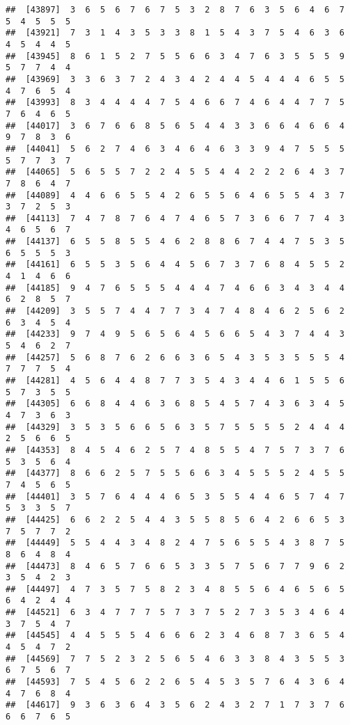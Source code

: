 \documentclass[
]{book}
\begin{document}
\begin{verbatim}
##  [43897]  3  6  5  6  7  6  7  5  3  2  8  7  6  3  5  6  4  6  7  5  4  5  5  5
##  [43921]  7  3  1  4  3  5  3  3  8  1  5  4  3  7  5  4  6  3  6  4  5  4  4  5
##  [43945]  8  6  1  5  2  7  5  5  6  6  3  4  7  6  3  5  5  5  9  5  7  7  4  4
##  [43969]  3  3  6  3  7  2  4  3  4  2  4  4  5  4  4  4  6  5  5  4  7  6  5  4
##  [43993]  8  3  4  4  4  4  7  5  4  6  6  7  4  6  4  4  7  7  5  7  6  4  6  5
##  [44017]  3  6  7  6  6  8  5  6  5  4  4  3  3  6  6  4  6  6  4  9  7  8  3  6
##  [44041]  5  6  2  7  4  6  3  4  6  4  6  3  3  9  4  7  5  5  5  5  7  7  3  7
##  [44065]  5  6  5  5  7  2  2  4  5  5  4  4  2  2  2  6  4  3  7  7  8  6  4  7
##  [44089]  4  4  6  6  5  5  4  2  6  5  5  6  4  6  5  5  4  3  7  3  7  2  5  3
##  [44113]  7  4  7  8  7  6  4  7  4  6  5  7  3  6  6  7  7  4  3  4  6  5  6  7
##  [44137]  6  5  5  8  5  5  4  6  2  8  8  6  7  4  4  7  5  3  5  6  5  5  5  3
##  [44161]  6  5  5  3  5  6  4  4  5  6  7  3  7  6  8  4  5  5  2  4  1  4  6  6
##  [44185]  9  4  7  6  5  5  5  4  4  4  7  4  6  6  3  4  3  4  4  6  2  8  5  7
##  [44209]  3  5  5  7  4  4  7  7  3  4  7  4  8  4  6  2  5  6  2  6  3  4  5  4
##  [44233]  9  7  4  9  5  6  5  6  4  5  6  6  5  4  3  7  4  4  3  5  4  6  2  7
##  [44257]  5  6  8  7  6  2  6  6  3  6  5  4  3  5  3  5  5  5  4  7  7  7  5  4
##  [44281]  4  5  6  4  4  8  7  7  3  5  4  3  4  4  6  1  5  5  6  5  7  3  5  5
##  [44305]  6  6  8  4  4  6  3  6  8  5  4  5  7  4  3  6  3  4  5  4  7  3  6  3
##  [44329]  3  5  3  5  6  6  5  6  3  5  7  5  5  5  5  2  4  4  4  2  5  6  6  5
##  [44353]  8  4  5  4  6  2  5  7  4  8  5  5  4  7  5  7  3  7  6  5  3  5  6  4
##  [44377]  8  6  6  2  5  7  5  5  6  6  3  4  5  5  5  2  4  5  5  7  4  5  6  5
##  [44401]  3  5  7  6  4  4  4  6  5  3  5  5  4  4  6  5  7  4  7  5  3  3  5  7
##  [44425]  6  6  2  2  5  4  4  3  5  5  8  5  6  4  2  6  6  5  3  7  5  7  7  2
##  [44449]  5  5  4  4  3  4  8  2  4  7  5  6  5  5  4  3  8  7  5  8  6  4  8  4
##  [44473]  8  4  6  5  7  6  6  5  3  3  5  7  5  6  7  7  9  6  2  3  5  4  2  3
##  [44497]  4  7  3  5  7  5  8  2  3  4  8  5  5  6  4  6  5  6  5  6  4  2  4  4
##  [44521]  6  3  4  7  7  7  5  7  3  7  5  2  7  3  5  3  4  6  4  3  7  5  4  7
##  [44545]  4  4  5  5  5  4  6  6  6  2  3  4  6  8  7  3  6  5  4  4  5  4  7  2
##  [44569]  7  7  5  2  3  2  5  6  5  4  6  3  3  8  4  3  5  5  3  6  7  5  6  7
##  [44593]  7  5  4  5  6  2  2  6  5  4  5  3  5  7  6  4  3  6  4  4  7  6  8  4
##  [44617]  9  3  6  3  6  4  3  5  6  2  4  3  2  7  1  7  3  7  6  6  6  7  6  5

\end{verbatim}
\end{document}
